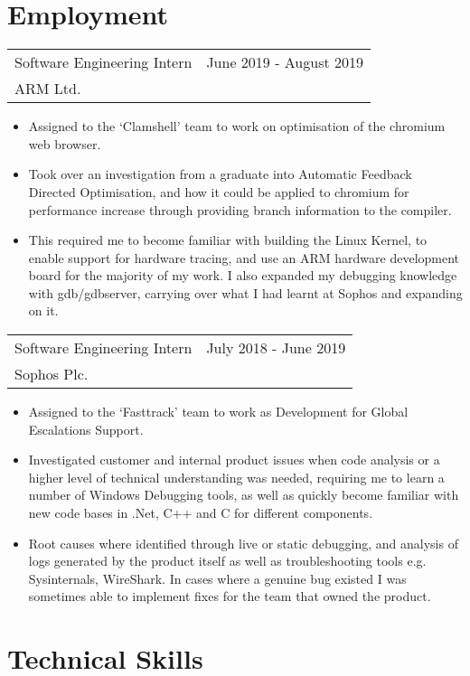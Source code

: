 \documentclass{article}
\begin{document}
 \section{Employment}
  \begin{tabularx}{\textwidth}{ X X }
Software Engineering Intern & June 2019 - August 2019 \\
ARM Ltd. & \\
  \end{tabularx}
  \begin{itemize}
   \item Assigned to the ‘Clamshell’ team to work on optimisation of the chromium web browser.
   \item Took over an investigation from a graduate into Automatic Feedback Directed Optimisation, and how it could be applied to chromium for performance increase through providing branch information to the compiler.
   \item This required me to become familiar with building the Linux Kernel, to enable support for hardware tracing, and use an ARM hardware development board for the majority of my work. I also expanded my debugging knowledge with gdb/gdbserver, carrying over what I had learnt at Sophos and expanding on it.
  \end{itemize}

  \begin{tabularx}{\textwidth}{ X X }
Software Engineering Intern & July 2018 - June 2019 \\
Sophos Plc. & \\
  \end{tabularx}
  \begin{itemize}
   \item Assigned to the ‘Fasttrack’ team to work as Development for Global Escalations Support.
   \item Investigated customer and internal product issues when code analysis or a higher level of technical understanding was needed, requiring me to learn a number of Windows Debugging tools, as well as quickly become familiar with new code bases in .Net, C++ and C for different components.
   \item Root causes where identified through live or static debugging, and analysis of logs generated by the product itself as well as troubleshooting tools e.g. Sysinternals, WireShark. In cases where a genuine bug existed I was sometimes able to implement fixes for the team that owned the product.
  \end{itemize}

  \section{Technical Skills}
\end{document}
